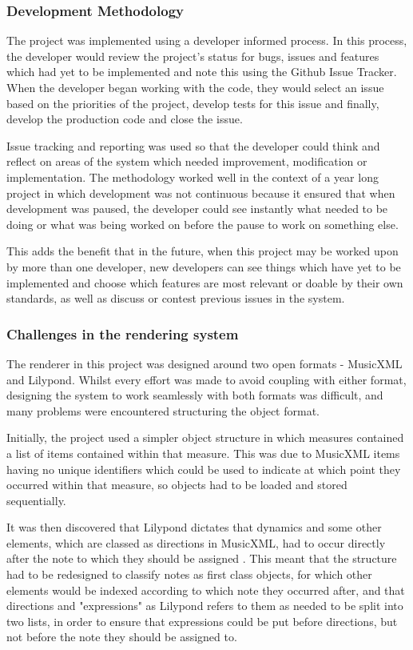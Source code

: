 \subsubsection{Development Methodology}
The project was implemented using a developer informed process. In this process, the developer would review the project's status for bugs, issues and features which had yet to be implemented and note this using the Github Issue Tracker. When the developer began working with the code, they would select an issue based on the priorities of the project, develop tests for this issue and finally, develop the production code and close the issue.


Issue tracking and reporting was used so that the developer could think and reflect on areas of the system which needed improvement, modification or implementation. The methodology worked well in the context of a year long project in which development was not continuous because it ensured that when development was paused, the developer could see instantly what needed to be doing or what was being worked on before the pause to work on something else. 

This adds the benefit that in the future, when this project may be worked upon by more than one developer, new developers can see things which have yet to be implemented and choose which features are most relevant or doable by their own standards, as well as discuss or contest previous issues in the system.


\subsubsection{Challenges in the rendering system}
The renderer in this project was designed around two open formats - MusicXML and Lilypond. Whilst every effort was made to avoid coupling with either format, designing the system to work seamlessly with both formats was difficult, and many problems were encountered structuring the object format.

Initially, the project used a simpler object structure in which measures contained a list of items contained within that measure. This was due to MusicXML items having no unique identifiers which could be used to indicate at which point they occurred within that measure, so objects had to be loaded and stored sequentially.

It was then discovered that Lilypond dictates that dynamics and some other elements, which are classed as directions in MusicXML, had to occur directly after the note to which they should be assigned %
. This meant that the structure had to be redesigned to classify notes as first class objects, for which other elements would be indexed according to which note they occurred after, and that directions and "expressions" as Lilypond refers to them as needed to be split into two lists, in order to ensure that expressions could be put before directions, but not before the note they should be assigned to.

